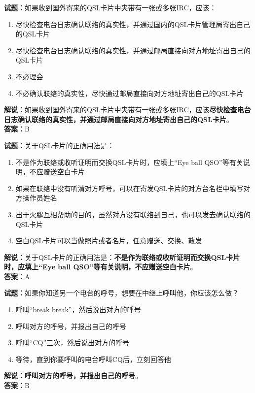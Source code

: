 \documentclass{ctexbook}
\begin{document}
\noindent\textbf{试题：}如果收到国外寄来的QSL卡片中夹带有一张或多张IRC，应该：
\begin{enumerate}[leftmargin=3em]
\item 尽快检查电台日志确认联络的真实性，并通过国内的QSL卡片管理局寄出自己的QSL卡片
\item 尽快检查电台日志确认联络的真实性，并通过邮局直接向对方地址寄出自己的QSL卡片
\item 不必理会
\item 不必确认联络的真实性，尽快通过邮局直接向对方地址寄出自己的QSL卡片
\end{enumerate}
\noindent\textbf{解说：}如果收到国外寄来的QSL卡片中夹带有一张或多张IRC，应该\textbf{尽快检查电台日志确认联络的真实性，并通过邮局直接向对方地址寄出自己的QSL卡片}。\\\noindent\textbf{答案：}B




\bigskip


\noindent\textbf{试题：}关于QSL卡片的正确用法是：
\begin{enumerate}[leftmargin=3em]
\item 不是作为联络或收听证明而交换QSL卡片时，应填上“Eye ball QSO”等有关说明，不应赠送空白卡片
\item 如果在联络中没有听清对方呼号，可以在寄发QSL卡片的对方台名栏中填写对方操作员姓名
\item 出于火腿互相帮助的目的，虽然对方没有联络到自己，也可以发去确认联络的QSL卡片
\item 空白QSL卡片可以当做照片或者名片，任意赠送、交换、散发
\end{enumerate}
\noindent\textbf{解说：}关于QSL卡片的正确用法是：\textbf{不是作为联络或收听证明而交换QSL卡片时，应填上“Eye ball QSO”等有关说明，不应赠送空白卡片}。\\\noindent\textbf{答案：}A

\bigskip


\noindent\textbf{试题：}如果你知道另一个电台的呼号，想要在中继上呼叫他，你应该怎么做？
\begin{enumerate}[leftmargin=3em]
\item 呼叫“break break”，然后说出对方的呼号
\item 呼叫对方的呼号，并报出自己的呼号
\item 呼叫“CQ”三次，然后说出对方的呼号
\item 等待，直到你要呼叫的电台呼叫CQ后，立刻回答他
\end{enumerate}
\noindent\textbf{解说：}\textbf{呼叫对方的呼号，并报出自己的呼号}。\\\noindent\textbf{答案：}B
\end{document}
